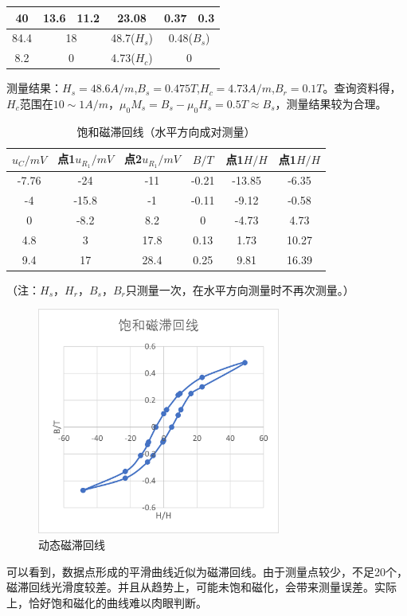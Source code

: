 \documentclass[11pt]{article}
\begin{document}
\begin{enumerate}
\begin{enumerate}
\begin{table}[H]
\begin{tabular}{|c|c|c|c|c|c|}
            40     & \multicolumn{1}{|c|}{13.6} & \multicolumn{1}{|c|}{11.2} & 23.08  & 0.37   & 0.3 \\\hline
            84.4   & \multicolumn{2}{|c|}{18} & 48.7($H_s$)   & \multicolumn{2}{|c|}{0.48($B_s$)} \\\hline
            8.2    & \multicolumn{2}{|c|}{0} & 4.73($H_c$)   & \multicolumn{2}{|c|}{0}  \\\hline
            \end{tabular}%
          \label{tab:饱和磁滞回线1}%
        \end{table}%
        测量结果：$H_s=48.6A/m$,$B_s=0.475T$,$H_c=4.73A/m$,$B_r=0.1T$。查询资料得，$H_c$范围在$10 \sim 1A/m$，$\mu_0M_s=B_s-\mu_0H_s=0.5T\approx B_s$，测量结果较为合理。
        \begin{table}[H]
          \centering
          \caption{饱和磁滞回线（水平方向成对测量）}
            \begin{tabular}{|c|c|c|c|c|c|}\hline
            $u_C/mV$   & 点1$u_{R_1}/mV$ & 点2$u_{R_1}/mV$     & $B/T$  & 点1$H/H$    & 点1$H/H$ \\\hline
            -7.76  & -24    & -11    & -0.21  & -13.85 & -6.35 \\\hline
            -4     & -15.8  & -1     & -0.11  & -9.12  & -0.58 \\\hline
            0      & -8.2   & 8.2    & 0      & -4.73  & 4.73 \\\hline
            4.8    & 3      & 17.8   & 0.13   & 1.73   & 10.27 \\\hline
            9.4    & 17     & 28.4   & 0.25   & 9.81   & 16.39 \\\hline
            \end{tabular}%
          \label{tab:饱和磁滞回线2}%
        \end{table}%
        （注：$H_s$，$H_r$，$B_s$，$B_r$只测量一次，在水平方向测量时不再次测量。）
        \begin{figure}[H]
            \centering
            \includegraphics[width=8cm]{Fig/4.png}
            \caption{动态磁滞回线}
        \end{figure}
        可以看到，数据点形成的平滑曲线近似为磁滞回线。由于测量点较少，不足20个，磁滞回线光滑度较差。并且从趋势上，可能未饱和磁化，会带来测量误差。实际上，恰好饱和磁化的曲线难以肉眼判断。


\end{enumerate}
\end{enumerate}
\end{document}
